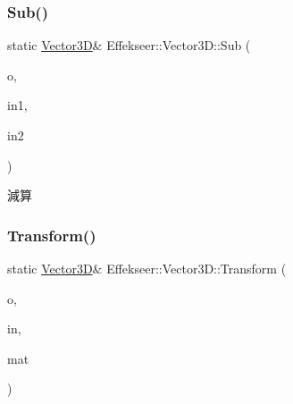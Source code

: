 \mbox{\label{struct_effekseer_1_1_vector3_d_a7eeecc19d710f839660f1a6dcefbebb1}} 
\subsubsection{\texorpdfstring{Sub()}{Sub()}}
{\footnotesize\ttfamily static \mbox{\hyperlink{struct_effekseer_1_1_vector3_d}{Vector3D}}\& Effekseer\+::\+Vector3\+D\+::\+Sub (\begin{DoxyParamCaption}\item[{\mbox{\hyperlink{struct_effekseer_1_1_vector3_d}{Vector3D}} \&}]{o,  }\item[{const \mbox{\hyperlink{struct_effekseer_1_1_vector3_d}{Vector3D}} \&}]{in1,  }\item[{const \mbox{\hyperlink{struct_effekseer_1_1_vector3_d}{Vector3D}} \&}]{in2 }\end{DoxyParamCaption})\hspace{0.3cm}{\ttfamily [static]}}



減算 

\mbox{\label{struct_effekseer_1_1_vector3_d_ae46e69eb77703cd01dc860d5024cec7d}} 
\subsubsection{\texorpdfstring{Transform()}{Transform()}\hspace{0.1cm}{\footnotesize\ttfamily [1/2]}}
{\footnotesize\ttfamily static \mbox{\hyperlink{struct_effekseer_1_1_vector3_d}{Vector3D}}\& Effekseer\+::\+Vector3\+D\+::\+Transform (\begin{DoxyParamCaption}\item[{\mbox{\hyperlink{struct_effekseer_1_1_vector3_d}{Vector3D}} \&}]{o,  }\item[{const \mbox{\hyperlink{struct_effekseer_1_1_vector3_d}{Vector3D}} \&}]{in,  }\item[{const \mbox{\hyperlink{struct_effekseer_1_1_matrix43}{Matrix43}} \&}]{mat }\end{DoxyParamCaption})\hspace{0.3cm}{\ttfamily [static]}}

